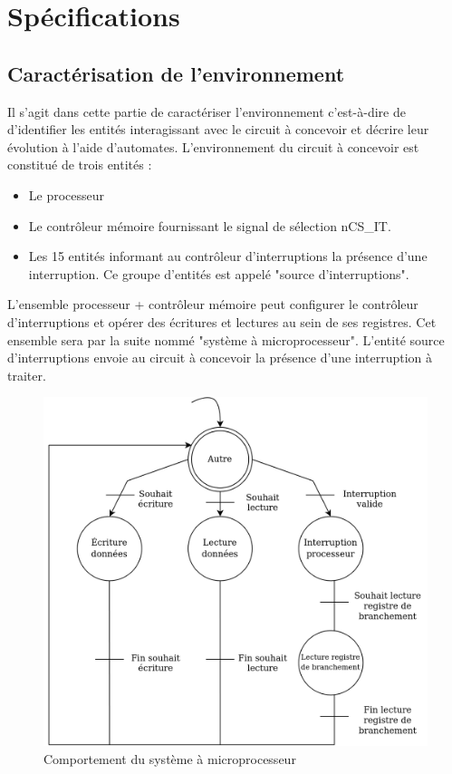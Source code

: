 \section{Spécifications}

\subsection{Caractérisation de l'environnement}

Il s'agit dans cette partie de caractériser l'environnement c'est-à-dire de d'identifier les entités interagissant avec le circuit à concevoir et décrire leur évolution à l'aide d'automates.
L'environnement du circuit à concevoir est constitué de trois entités :

\begin{itemize}
	\item Le processeur
	\item Le contrôleur mémoire fournissant le signal de sélection nCS\_IT.
	\item Les 15 entités informant au contrôleur d'interruptions la présence d'une interruption.
	Ce groupe d'entités est appelé "source d'interruptions".
\end{itemize}

L'ensemble processeur + contrôleur mémoire peut configurer le contrôleur d'interruptions et opérer des écritures et lectures au sein de ses registres.
Cet ensemble sera par la suite nommé "système à microprocesseur".
L'entité source d'interruptions envoie au circuit à concevoir la présence d'une interruption à traiter.

\begin{figure}[H]
	\centering
	\includegraphics[width=0.8\linewidth]{figure/spec_automate_proc_ctrlmem.png}
	\caption{Comportement du système à microprocesseur}
	\label{fig:spec_automate_sysmicro}
\end{figure} 

